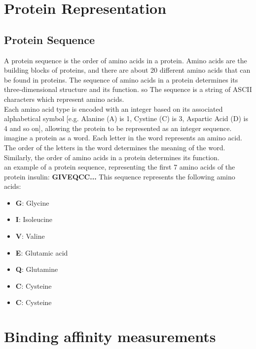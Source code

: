 \documentclass[11pt, a4paper]{article}
\begin{document}
\section{Protein Representation}
    \subsection{Protein Sequence}
    A protein sequence is the order of amino acids in a protein. Amino acids are the building blocks of proteins, and there are about 20 different amino acids that can be found in proteins. The sequence of amino acids in a protein determines its three-dimensional structure and its function.
    so The sequence is a string of ASCII characters which represent amino
    acids. 
    \\Each amino acid type is encoded with an integer based on its
    associated alphabetical symbol [e.g. Alanine (A) is 1, Cystine (C) is
    3, Aspartic Acid (D) is 4 and so on], allowing the protein to be represented as an integer sequence.
    imagine a protein as a word. Each letter in the word represents an amino acid. The order of the letters in the word determines the meaning of the word. Similarly, the order of amino acids in a protein determines its function.
    \\ an example of a protein sequence, representing the first 7 amino acids of the protein insulin:
    \textbf{GIVEQCC...}
    This sequence represents the following amino acids:
    \begin{itemize}
        \item \textbf{G}: Glycine
        \item \textbf{I}: Isoleucine
        \item \textbf{V}: Valine 
        \item \textbf{E}: Glutamic acid
        \item \textbf{Q}: Glutamine
        \item \textbf{C}: Cysteine
        \item \textbf{C}: Cysteine    
    \end{itemize}

\section{Binding affinity measurements}
\end{document}
